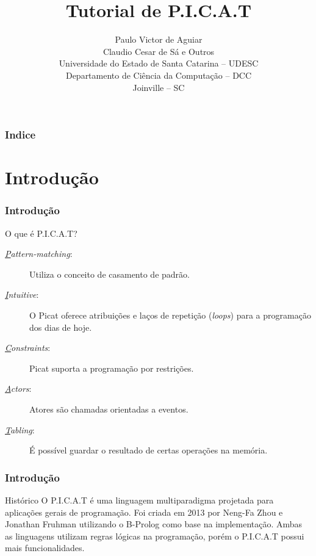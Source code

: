 \documentclass[sans]{beamer}
\title[Tutorial de P.I.C.A.T]{Tutorial de P.I.C.A.T}
\author[Paulo \& Claudio]{Paulo Victor de Aguiar\\
	Claudio Cesar de Sá e Outros\\ 
	Universidade do Estado de Santa Catarina -- UDESC\\
	Departamento de Ciência da Computação -- DCC\\
	Joinville -- SC}
\begin{document}
\begin{frame}[fragile]   %
\maketitle
\end{frame}


\begin{frame}[fragile]   %
\frametitle{Indice}
\tableofcontents
\end{frame}


\section{Introdução}
\begin{frame}[fragile]   %
\frametitle{Introdução}
\begin{block}{O que é P.I.C.A.T?}
 \begin{description}
 \item [\textit{\underline{P}attern-matching}:] Utiliza o conceito de casamento de padrão. 
  
 \item [\textit{\underline{I}ntuitive}:] O Picat oferece atribuições e laços de repetição (\textit{loops}) para a programação dos dias de hoje.
 
 \item [\textit{\underline{C}onstraints}:] Picat suporta a programação por restrições.
 
 \item [\textit{\underline{A}ctors}:] Atores são chamadas orientadas a eventos.
 
 \item [\textit{\underline{T}abling}:] É possível guardar o resultado de certas operações na memória.
 
 \end{description}
\end{block}
\end{frame}


\begin{frame}[fragile]   %
\frametitle{Introdução}
\begin{block}{Histórico}
  O P.I.C.A.T é uma linguagem multiparadigma projetada para aplicações gerais de programação.
  Foi criada em 2013 por Neng-Fa Zhou e Jonathan Fruhman utilizando o B-Prolog como base na implementação.  
  Ambas as linguagens utilizam regras lógicas na programação, porém o P.I.C.A.T possui mais funcionalidades.
\end{block}
\end{frame}
\end{document}
